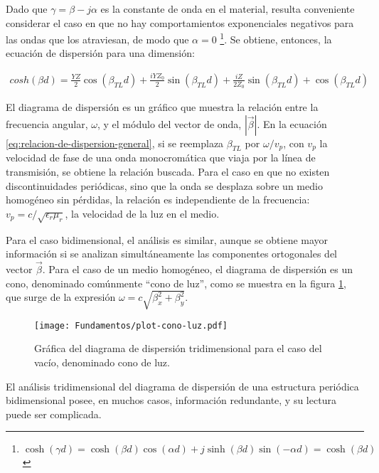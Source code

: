 Dado que $\gamma = \beta -j\alpha$ es la constante de onda en el material, resulta conveniente considerar el caso en que no hay comportamientos exponenciales negativos para las ondas que los atraviesan, de modo que $\alpha=0$ \footnote{$\cosh (\gamma d) = \cosh(\beta d)\cos(\alpha d) + j \sinh(\beta d) \sin(-\alpha d) = \cosh (\beta d)$}. Se obtiene, entonces, la ecuación de dispersión para una dimensión:

\begin{align}
	\label{eq:relacion-de-dispersion-general}
	cosh(\beta d) = \frac{Y Z}{2} \cos{\left (\beta_{TL} d \right )} + \frac{i Y Z_{0}}{2} \sin{\left (\beta_{TL} d \right )} + \frac{i Z}{2 Z_{0}} \sin{\left (\beta_{TL} d \right )} + \cos{\left (\beta_{TL} d \right )}
\end{align}

El diagrama de dispersión es un gráfico que muestra la relación entre la frecuencia angular, $\omega$, y el módulo del vector de onda, $|\vec{\beta}|$. En la ecuación \ref{eq:relacion-de-dispersion-general}, si se reemplaza $\beta_{TL}$ por $\omega/v_p$, con $v_p$ la velocidad de fase de una onda monocromática que viaja por la línea de transmisión, se obtiene la relación buscada. Para el caso en que no existen discontinuidades periódicas, sino que la onda se desplaza sobre un medio homogéneo sin pérdidas, la relación es independiente de la frecuencia: $v_p = c/\sqrt{\epsilon_r \mu_r}$, la velocidad de la luz en el medio.

Para el caso bidimensional, el análisis es similar, aunque se obtiene mayor información si se analizan simultáneamente las componentes ortogonales del vector $\vec{\beta}$. Para el caso de un medio homogéneo, el diagrama de dispersión es un cono, denominado comúnmente \enquote{cono de luz}, como se muestra en la figura \ref{fig:diagrama-dispersion-vacio-3d}, que surge de la expresión $\omega = c \sqrt{\beta_x^2 + \beta_y^2}$.

\begin{figure}[htp]
	\centering
	\texttt{[image: Fundamentos/plot-cono-luz.pdf]}
	\caption{Gráfica del diagrama de dispersión tridimensional para el caso del vacío, denominado cono de luz.}
	\label{fig:diagrama-dispersion-vacio-3d}
\end{figure}

El análisis tridimensional del diagrama de dispersión de una estructura periódica bidimensional posee, en muchos casos, información redundante, y su lectura puede ser complicada.

